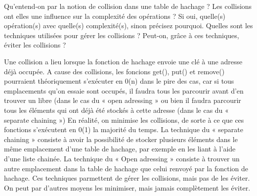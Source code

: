 Qu’entend-on par la notion de collision dans une table de hachage ? Les collisions ont elles une influence sur la complexité des opérations ? Si oui, quelle(s) opération(s) avec quelle(s) complexité(s), sinon précisez pourquoi. Quelles sont les techniques utilisées pour gérer les collisions ? Peut-on, grâce à ces techniques, éviter les collisions ?

Une collision a lieu lorsque la fonction de hachage envoie une clé à une adresse déjà occupée. A cause des collisions, les foncions get(), put() et remove() pourraient théoriquement s’exécuter en 0(n) dans le pire des cas, car si tous emplacements qu’on essaie sont occupés, il faudra tous les parcourir avant d’en trouver un libre (dans le cas du « open adressing » ou bien il faudra parcourir tous les éléments qui ont déjà été stockés à cette adresse (dans le cas du « separate chaining ») En réalité, on minimise les collisions, de sorte à ce que ces fonctions s’exécutent en 0(1) la majorité du temps. La technique du « separate chaining » consiste à avoir la possibilité de stocker plusieurs éléments dans le même emplacement d’une table de hachage, par exemple en les liant à l’aide d’une liste chainée. La technique du « Open adressing » consiste à trouver un autre emplacement dans la table de hachage que celui renvoyé par la fonction de hachage. Ces techniques parmettent de gérer les collisions, mais pas de les éviter. On peut par d’autres moyens les minimiser, mais jamais complètement les éviter.
